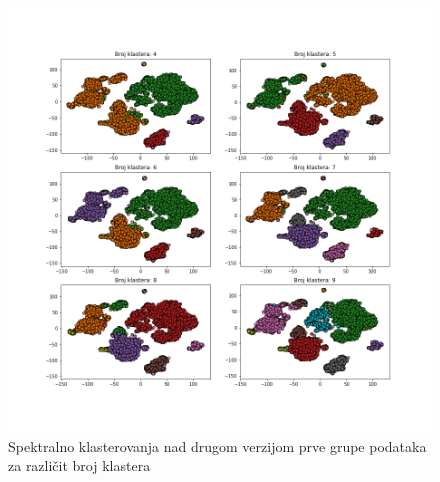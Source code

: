 \documentclass[a4paper]{article}
\begin{document}
\begin{figure}[h!]
\centering
\includegraphics[scale=0.4]{hvg_nmf_spectral}
\caption{Spektralno klasterovanja nad drugom verzijom prve grupe podataka za različit broj klastera}
\label{hvg_nmf_spectral}
\end{figure}

\newpage


\end{document}
